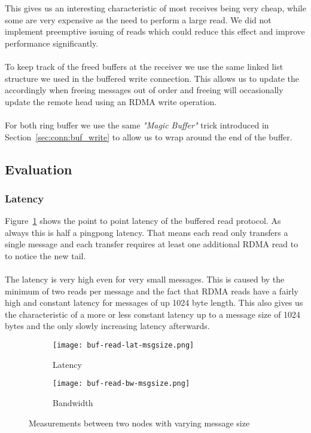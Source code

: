 This gives us an interesting characteristic of most receives being very cheap, while some are very expensive as the need to 
perform a large read. We did not implement preemptive issuing of reads which could reduce this effect and improve performance
significantly.

\paragraph{} To keep track of the freed buffers at the receiver we use the same linked list structure we used in the buffered
write connection. This allows us to update the  accordingly when freeing messages out of order and freeing will
occasionally update the remote head using an RDMA write operation.

\paragraph{} For both ring buffer we use the same \emph{"Magic Buffer"} trick introduced in Section~\ref{sec:conn:buf_write} to 
allow us to wrap around the end of the buffer.

\subsection{Evaluation}

\subsubsection{Latency}

Figure~\ref{fig:plot-bufread-lat} shows the point to point latency of the buffered read protocol. As always this is half 
a pingpong latency. That means each read only transfers a single message and each transfer requires at least one additional 
RDMA read to to notice the new tail.

\paragraph{} The latency is very high even for very small messages. This is caused by the minimum of two reads per message and
the fact that RDMA reads have a fairly high and constant latency for messages of up 1024 byte length. This also gives us the
characteristic of a more or less constant latency up to a message size of 1024 bytes and the only slowly increasing latency
afterwards.


\begin{figure}[htp]
  \centering
\begin{subfigure}[b]{0.49\textwidth}
  \texttt{[image: buf-read-lat-msgsize.png]}
  \caption{Latency}
  \label{fig:plot-bufread-lat}
\end{subfigure}
\begin{subfigure}[b]{0.49\textwidth}
  \centering
  \texttt{[image: buf-read-bw-msgsize.png]}
  \caption{Bandwidth}
  \label{fig:plot-bufread-bw}
\end{subfigure}
\caption{Measurements between two nodes with varying message size}
\end{figure}

